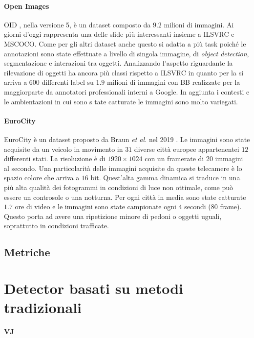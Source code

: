 \paragraph{Open Images} 
\ac{OID} \cite{krasin2017openimages}, nella versione 5, è un dataset composto da $9.2$ milioni di immagini. Ai giorni d'oggi rappresenta una delle sfide più interessanti insieme a \ac{ILSVRC} e \ac{MSCOCO}. Come per gli altri dataset anche questo si adatta a più task poiché le annotazioni sono state effettuate a livello di singola immagine, di \textit{object detection}, segmentazione e interazioni tra oggetti. 
Analizzando l'aspetto riguardante la rilevazione di oggetti ha ancora più classi rispetto a \ac{ILSVRC} in quanto per la si arriva a $600$ differenti label su $1.9$ milioni di immagini con \ac{BB} realizzate per la maggiorparte da annotatori professionali interni a Google. In aggiunta i contesti e le ambientazioni in cui sono s   tate catturate le immagini sono molto variegati.
\paragraph{EuroCity}  EuroCity è un dataset proposto da Braun \textit{et al. } nel 2019 \cite{braun2018eurocity}. Le immagini sono state acquisite da un veicolo in movimento in $31$ diverse città europee appartenentei $12$ differenti stati.
La risoluzione è di $1920 \times 1024$ con un framerate di $20$ immagini al secondo. Una particolarità delle immagini acquisite da queste telecamere è lo spazio colore che arriva a $16$ bit. Quest'alta gamma dinamica si traduce in una più alta qualità dei fotogrammi in condizioni di luce non ottimale, come può essere un controsole o una notturna. 
Per ogni città in media sono state catturate $1.7$ ore di video e le immagini sono state campionate ogni $4$ secondi ($80$ frame). Questo porta ad avere una ripetizione minore di pedoni o oggetti uguali, soprattutto in condizioni trafficate.

\subsection{Metriche}
\section{Detector basati su metodi tradizionali}
\label{sec:traditional_method}
\paragraph{VJ}

